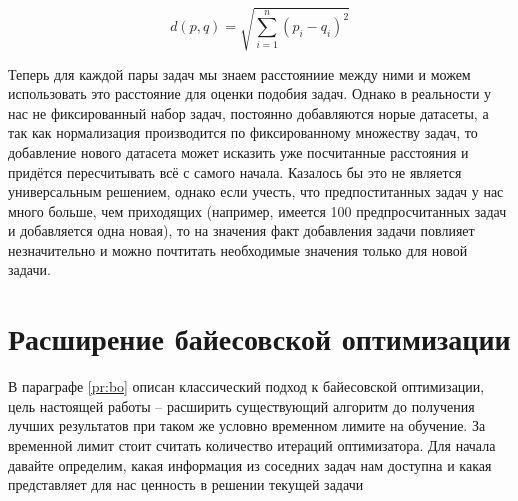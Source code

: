 \documentclass[times,specification,annotation]{itmo-student-thesis}
\begin{document}
	\begin{equation}
	\mathit d(p,q)=\sqrt{\sum_{i=1}^{n} (p_{i}-q_{i})^{2}}
	\label{eq:euclid}
	\end{equation}\par
	Теперь для каждой пары задач мы знаем расстояниие между ними и можем использовать это расстояние для оценки подобия задач. Однако в реальности у нас не фиксированный набор задач, постоянно добавляются норые датасеты, а так как нормализация производится по фиксированному множеству задач, то добавление нового датасета может исказить уже посчитанные расстояния и придётся пересчитывать всё с самого начала. Казалось бы это не является универсальным решением, однако если учесть, что предпоститанных задач у нас много больше, чем приходящих (например, имеется 100 предпросчитанных задач и добавляется одна новая), то на значения факт добавления задачи повлияет незначительно и можно почтитать необходимые значения только для новой задачи.
	
	\section{Расширение байесовской оптимизации} \label{c:my_bo}
	В параграфе \ref{pr:bo} описан классический подход к байесовской оптимизации, цель настоящей работы -- расширить существующий алгоритм до получения лучших результатов при таком же условно временном лимите на обучение. За временной лимит стоит считать количество итераций оптимизатора. Для начала давайте определим, какая информация из соседних задач нам доступна и какая представляет для нас ценность в решении текущей задачи\par
\end{document}
